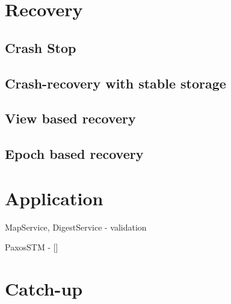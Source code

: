 \section{Recovery}

\subsection{Crash Stop}
\label{sec:crash-stop}

\subsection{Crash-recovery with stable storage}
\label{sec:full-ss}

\subsection{View based recovery}
\label{sec:view-ss}

\subsection{Epoch based recovery}
\label{sec:epoch-ss}

\section{Application}
MapService, DigestService - validation

PaxosSTM - []


%
%
%
%
%
\section{Catch-up}
\label{sec:catch-up}

